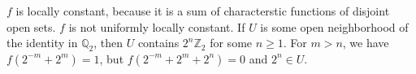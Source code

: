 \documentclass[12pt]{article}
\begin{document}
$f$ is locally constant, because it is a sum of characterstic functions of
disjoint open sets. $f$ is not uniformly locally constant. If $U$ is some open
neighborhood of the identity in $\mathbb{Q}_{2}$, then $U$ contains
$2^{n}\mathbb{Z}_{2}$ for some $n \geq 1$. For $m > n$, we have $f\left(2^{-m} +
2^{m}\right) = 1$, but $f\left(2^{-m} + 2^{m} + 2^{n}\right) = 0$ and $2^{n} \in
U$.
\end{document}
